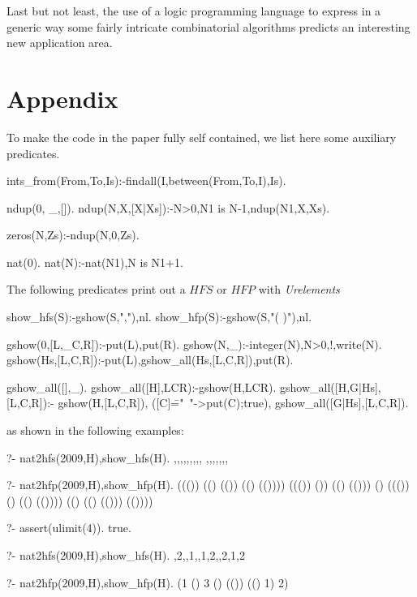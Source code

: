 \documentclass[]{INCLUDES/llncs}
\begin{document}
Last but not least, the use of a logic programming language to express
in a generic way some fairly intricate combinatorial algorithms
predicts an interesting new application area.


%


\newpage
\appendix
\section{Appendix}
To make the code in the paper fully self contained, 
we list here some auxiliary predicates.

\begin{code}
ints_from(From,To,Is):-findall(I,between(From,To,I),Is).

ndup(0, _,[]).
ndup(N,X,[X|Xs]):-N>0,N1 is N-1,ndup(N1,X,Xs).
  
zeros(N,Zs):-ndup(N,0,Zs).

nat(0).
nat(N):-nat(N1),N is N1+1.  
\end{code}

The following predicates print out a $HFS$ or $HFP$ with {\em Urelements}
\begin{code}
show_hfs(S):-gshow(S,"{,}"),nl.
show_hfp(S):-gshow(S,"( )"),nl.

gshow(0,[L,_C,R]):-put(L),put(R).
gshow(N,_):-integer(N),N>0,!,write(N).
gshow(Hs,[L,C,R]):-put(L),gshow_all(Hs,[L,C,R]),put(R).

gshow_all([],_).
gshow_all([H],LCR):-gshow(H,LCR).
gshow_all([H,G|Hs],[L,C,R]):-
  gshow(H,[L,C,R]),
  ([C]\=="~"->put(C);true),
  gshow_all([G|Hs],[L,C,R]).
\end{code}
as shown in the following examples: 
\begin{codex}
?- nat2hfs(2009,H),show_hfs(H).
{{},{{},{{}}},{{{{}}}},{{{}},{{{}}}},{{},{{}},{{{}}}},
    {{{},{{}}}},{{},{{},{{}}}},{{{}},{{},{{}}}}}

?- nat2hfp(2009,H),show_hfp(H).
((()) (() (()) (() (()))) ((()) ()) (() (())) () 
 ((()) () (() (()))) (() (() (())) (())))
 
?- assert(ulimit(4)).
true.

?- nat2hfs(2009,H),show_hfs(H).
{{},2,{},{1},{{},1},{2},{{},2},{1,2}}

?- nat2hfp(2009,H),show_hfp(H).
(1 () 3 () (()) (() 1) 2)
 \end{codex}
\end{document}
